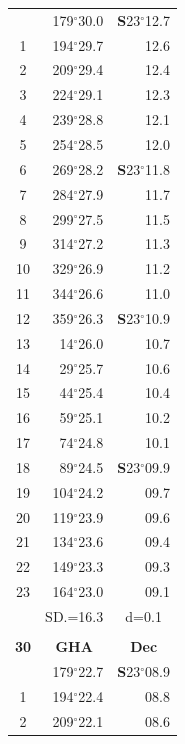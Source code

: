 \documentclass[10pt, a4paper]{report}
\begin{document}
\begin{scriptsize}
\begin{tabular*}{0.2\textwidth}[t]{@{\extracolsep{\fill}}|c|rr|}
\hline\rule{0pt}{2.6ex}\noindent
0 & 179$^\circ$30.0 & \textbf{S}23$^\circ$12.7\\
1 & 194$^\circ$29.7 & 12.6\\
2 & 209$^\circ$29.4 & 12.4\\
3 & 224$^\circ$29.1 & \raisebox{0.24ex}{\boldmath$\cdot$~\boldmath$\cdot$~~}12.3\\
4 & 239$^\circ$28.8 & 12.1\\
5 & 254$^\circ$28.5 & 12.0\\[2Pt]
6 & 269$^\circ$28.2 & \textbf{S}23$^\circ$11.8\\
7 & 284$^\circ$27.9 & 11.7\\
8 & 299$^\circ$27.5 & 11.5\\
9 & 314$^\circ$27.2 & \raisebox{0.24ex}{\boldmath$\cdot$~\boldmath$\cdot$~~}11.3\\
10 & 329$^\circ$26.9 & 11.2\\
11 & 344$^\circ$26.6 & 11.0\\[2Pt]
12 & 359$^\circ$26.3 & \textbf{S}23$^\circ$10.9\\
13 & 14$^\circ$26.0 & 10.7\\
14 & 29$^\circ$25.7 & 10.6\\
15 & 44$^\circ$25.4 & \raisebox{0.24ex}{\boldmath$\cdot$~\boldmath$\cdot$~~}10.4\\
16 & 59$^\circ$25.1 & 10.2\\
17 & 74$^\circ$24.8 & 10.1\\[2Pt]
18 & 89$^\circ$24.5 & \textbf{S}23$^\circ$09.9\\
19 & 104$^\circ$24.2 & 09.7\\
20 & 119$^\circ$23.9 & 09.6\\
21 & 134$^\circ$23.6 & \raisebox{0.24ex}{\boldmath$\cdot$~\boldmath$\cdot$~~}09.4\\
22 & 149$^\circ$23.3 & 09.3\\
23 & 164$^\circ$23.0 & 09.1\\
\hline
\rule{0pt}{2.4ex} & \multicolumn{1}{c}{SD.=16.3} & \multicolumn{1}{c|}{d=0.1}\\
\hline
\multicolumn{1}{c}{}\\[-0.5ex]\hline
\multicolumn{1}{|c|}{\rule{0pt}{2.6ex}\textbf{30}} & \multicolumn{1}{c}{\textbf{GHA}} & \multicolumn{1}{c|}{\textbf{Dec}}\\
\hline\rule{0pt}{2.6ex}\noindent
0 & 179$^\circ$22.7 & \textbf{S}23$^\circ$08.9\\
1 & 194$^\circ$22.4 & 08.8\\
2 & 209$^\circ$22.1 & 08.6\\

\end{tabular*}
\end{scriptsize}
\end{document}
